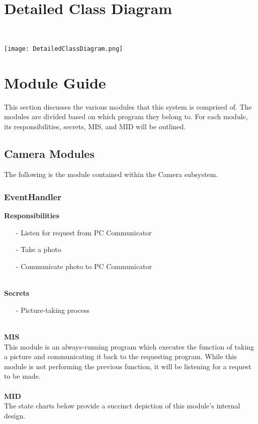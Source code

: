 \documentclass[titlepage]{article}
\begin{document}
\section{Detailed Class Diagram}~\\
\begin{center}
	\texttt{[image: DetailedClassDiagram.png]}
\label{fig:detailedClassDiagram}
\end{center}
\newpage

\section{Module Guide}
This section discusses the various modules that this system is comprised of. The modules are divided based on which program they belong to. For each module, its responsibilities, secrets, MIS, and MID will be outlined.
\subsection{Camera Modules}
The following is the module contained within the Camera subsystem.
\subsubsection{EventHandler}
\textbf{Responsibilities}
\begin{itemize}
	\item[-] Listen for request from PC Communicator
	\item[-] Take a photo
	\item[-] Communicate photo to PC Communicator
\end{itemize}~\\
\textbf{Secrets}
\begin{itemize}
	\item[-] Picture-taking process
\end{itemize}~\\
\textbf{MIS}\\[2mm]
This module is an always-running program which executes the function of taking a picture and communicating it back to the requesting program. While this module is not performing the previous function, it will be listening for a request to be made.
\\\\
\textbf{MID}\\[2mm]
The state charts below provide a succinct depiction of this module's internal design.
\\\\
\end{document}
